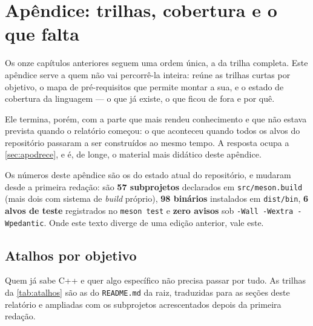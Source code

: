 
\section{Apêndice: trilhas, cobertura e o que falta}
\label{sec:trilhas}

Os onze capítulos anteriores seguem uma ordem única, a da trilha completa. Este
apêndice serve a quem não vai percorrê-la inteira: reúne as trilhas curtas por
objetivo, o mapa de pré-requisitos que permite montar a sua, e o estado de
cobertura da linguagem --- o que já existe, o que ficou de fora e por quê.

Ele termina, porém, com a parte que mais rendeu conhecimento e que não estava
prevista quando o relatório começou: o que aconteceu quando todos os alvos do
repositório passaram a ser construídos ao mesmo tempo. A resposta ocupa a
\cref{sec:apodrece}, e é, de longe, o material mais didático deste apêndice.

\begin{aviso}
Os números deste apêndice são os do estado atual do repositório, e mudaram desde
a primeira redação: são \textbf{57 subprojetos} declarados em
\texttt{src/meson.build} (mais dois com sistema de \emph{build} próprio),
\textbf{98 binários} instalados em \texttt{dist/bin}, \textbf{6 alvos de teste}
registrados no \texttt{meson test} e \textbf{zero avisos} sob
\texttt{-Wall -Wextra -Wpedantic}. Onde este texto diverge de uma edição
anterior, vale este.
\end{aviso}

\subsection{Atalhos por objetivo}
\label{sec:atalhos}

Quem já sabe C++ e quer algo específico não precisa passar por tudo. As trilhas
da \cref{tab:atalhos} são as do \texttt{README.md} da raiz, traduzidas para as
seções deste relatório e ampliadas com os subprojetos acrescentados depois da
primeira redação.

